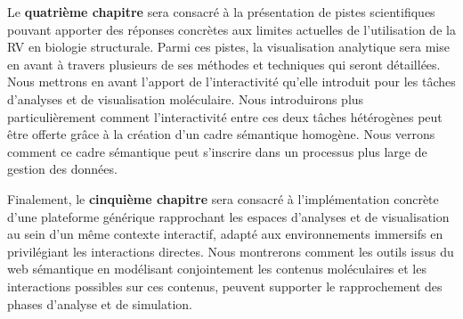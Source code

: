 Le \textbf{quatrième chapitre} sera consacré à la présentation de pistes scientifiques pouvant apporter des réponses concrètes aux limites actuelles de l'utilisation de la RV en biologie structurale. Parmi ces pistes, la visualisation analytique sera mise en avant à travers plusieurs de ses méthodes et techniques qui seront détaillées. Nous mettrons en avant l'apport de l'interactivité qu'elle introduit pour les tâches d'analyses et de visualisation moléculaire. Nous introduirons plus particulièrement comment l'interactivité entre ces deux tâches hétérogènes peut être offerte grâce à la création d'un cadre sémantique homogène. Nous verrons comment ce cadre sémantique peut s'inscrire dans un processus plus large de gestion des données.

Finalement, le \textbf{cinquième chapitre} sera consacré à l'implémentation concrète d'une plateforme générique rapprochant les espaces d'analyses et de visualisation au sein d'un même contexte interactif, adapté aux environnements immersifs en privilégiant les interactions directes. Nous montrerons comment les outils issus du web sémantique en modélisant conjointement les contenus moléculaires et les interactions possibles sur ces contenus, peuvent supporter le rapprochement des phases d'analyse et de simulation. 